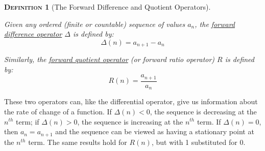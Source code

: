 \documentclass[12pt,a4paper]{article}
\newtheorem{definition}{\textsc{Definition}}[section]
\begin{document}
\begin{definition}[The Forward Difference and Quotient Operators]$\;$\par\vspace{1cm}

Given any ordered (finite or countable) sequence of values $a_n$, the \underline{forward difference operator} $\Delta$ is defined by:
$$\Delta(n) = a_{n+1}-a_n$$

Similarly, the \underline{forward quotient operator} (or forward ratio operator) $R$ is defined by:
$$R(n) = \frac{a_{n+1}}{a_n}$$

\end{definition}

These two operators can, like the differential operator, give us information about the rate of change of a function. If $\Delta(n) < 0$, the sequence is decreasing at the $n^{th}$ term; if $\Delta(n) > 0$, the sequence is increasing at the $n^{th}$ term. If $\Delta(n) = 0$, then $a_n = a_{n+1}$ and the sequence can be viewed as having a stationary point at the $n^{th}$ term. The same results hold for $R(n)$, but with 1 substituted for 0.
\end{document}
